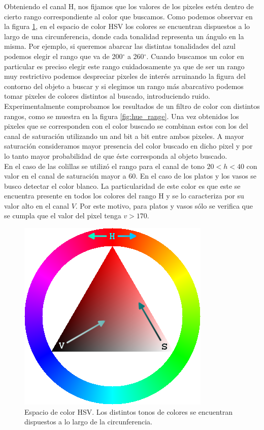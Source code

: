 Obteniendo el canal H, nos fijamos que los valores de los pixeles 
estén dentro de cierto rango correspondiente al color que buscamos. 
Como podemos observar en la figura \ref{fig:hsv_space}, en el espacio 
de color HSV los colores se encuentran dispuestos a lo largo de una 
circunferencia, donde cada tonalidad representa un ángulo en la misma. 
Por ejemplo, si queremos abarcar las distintas tonalidades del azul 
podemos elegir el rango que va de 200$^\circ$ a 260$^\circ$. Cuando 
buscamos un color en particular  es preciso elegir este rango 
cuidadosamente ya que de ser un rango muy restrictivo podemos 
despreciar pixeles de interés arruinando la figura del contorno del 
objeto a buscar y si elegimos un rango más abarcativo podemos tomar 
pixeles de colores distintos al buscado, introduciendo ruido. 
Experimentalmente comprobamos los resultados de un filtro de color con 
distintos rangos, como se muestra  en la figura \ref{fig:hue_range}. 
Una vez obtenidos los pixeles que se corresponden con el color buscado 
se combinan estos con los del canal de saturación utilizando un and 
bit a bit entre ambos pixeles. A mayor saturación consideramos mayor 
presencia del color buscado en dicho pixel y por lo tanto mayor 
probabilidad de que éste corresponda al objeto buscado. \\
\indent En el caso de las colillas se utilizó el rango para el canal de tono 
$20<h<40$ con valor en el canal de saturación mayor a 60. En el caso 
de los platos y los vasos se busco detectar el color blanco. La 
particularidad de este color es que este se encuentra presente en 
todos los colores del rango H y se lo caracteriza por su valor alto en 
el canal $V$. Por este motivo, para platos y vasos sólo se verifica que 
se cumpla que el valor del pixel tenga $v>170$.
\begin{figure}[tpb]
\begin{center}
  \includegraphics[scale=0.4]{figuras/hsv_triangle.png}
\end{center}
  \caption{\small Espacio de color HSV. Los distintos tonos de colores se encuentran dispuestos a lo largo de la circunferencia.}
  \label{fig:hsv_space}
\end{figure}

